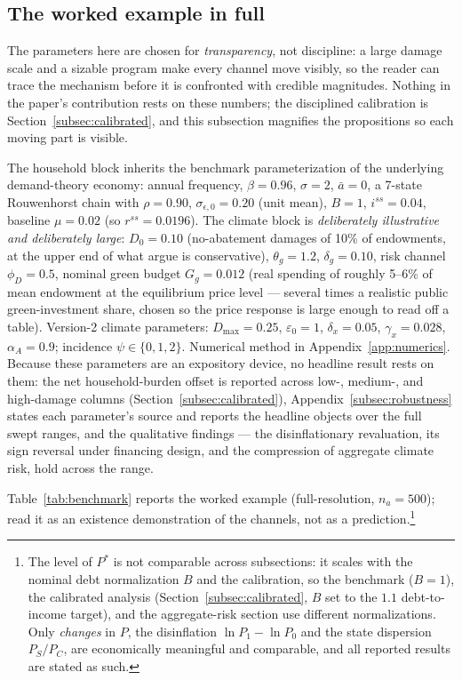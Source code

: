 \documentclass[12pt]{article}
\begin{document}
\subsection{The worked example in full}\label{subsec:workedexample}

The parameters here are chosen for \emph{transparency}, not discipline: a
large damage scale and a sizable program make every channel move visibly, so
the reader can trace the mechanism before it is confronted with credible
magnitudes. Nothing in the paper's contribution rests on these numbers; the
disciplined calibration is Section~\ref{subsec:calibrated}, and this
subsection magnifies the propositions so each moving part is visible.

The household block inherits the benchmark parameterization of the
underlying demand-theory economy: annual frequency, $\beta=0.96$,
$\sigma=2$, $\bar a=0$, a 7-state
Rouwenhorst chain with $\rho=0.90$, $\sigma_{\epsilon,0}=0.20$ (unit mean),
$B=1$, $i^{ss}=0.04$, baseline $\mu=0.02$ (so $r^{ss}=0.0196$). The climate
block is \emph{deliberately illustrative and deliberately large}: $D_0=0.10$
(no-abatement damages of 10\% of
endowments, at the upper end of what \citealp{bilalkanzig2024} argue is
conservative), $\theta_g=1.2$, $\delta_g=0.10$, risk channel $\phi_D=0.5$,
nominal green budget $G_g=0.012$ (real spending of roughly 5--6\% of mean
endowment at the equilibrium price level --- several times a realistic
public green-investment share, chosen so the price response is large enough
to read off a table). Version-2 climate parameters:
$D_{\max}=0.25$, $\varepsilon_0=1$, $\delta_x=0.05$, $\gamma_x=0.028$,
$\alpha_A=0.9$; incidence $\psi\in\{0,1,2\}$. Numerical method in
Appendix~\ref{app:numerics}. Because these parameters are an expository
device, no headline result rests on them: the net household-burden offset is
reported across low-, medium-, and high-damage columns
(Section~\ref{subsec:calibrated}), Appendix~\ref{subsec:robustness} states
each parameter's source and reports the headline objects over the full
swept ranges, and the qualitative findings --- the disinflationary
revaluation, its sign reversal under financing design, and the compression
of aggregate climate risk, hold across the range.



Table~\ref{tab:benchmark} reports the worked example (full-resolution,
$n_a=500$); read it as an existence demonstration of the channels, not as a
prediction.\footnote{The level of $P^{*}$ is not comparable across
subsections: it scales with the nominal debt normalization $B$ and the
calibration, so the benchmark ($B=1$), the calibrated analysis
(Section~\ref{subsec:calibrated}, $B$ set to the $1.1$ debt-to-income
target), and the aggregate-risk section use different normalizations. Only
\emph{changes} in $P$, the disinflation $\ln P_1-\ln P_0$ and the state
dispersion $P_S/P_C$, are economically meaningful and comparable, and all
reported results are stated as such.}
\end{document}
